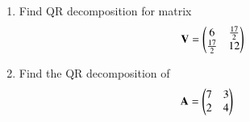 \begin{enumerate}[label=\thesubsection.\arabic*.,ref=\thesubsection.\theenumi]
\solution

%
\item 
Find QR decomposition for matrix
\begin{equation}
	\mathbf{V} = \begin{pmatrix}6 & \frac{17}{2}\\ \frac{17}{2} & 12\end{pmatrix}
\end{equation}
%
\solution

%
\item 
Find the QR decomposition of 
\begin{align}
    \mathbf{A} &= \begin{pmatrix}7 & 3 \\ 2 & 4\end{pmatrix} 
\end{align}
%
\solution

\end{enumerate}

